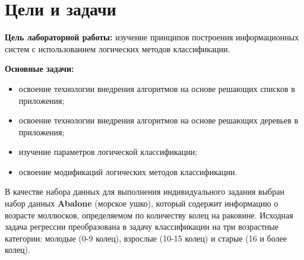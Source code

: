 \chapter*{Цели и задачи}
\label{ch:intro_lab4}

\textbf{Цель лабораторной работы:} изучение принципов построения информационных систем с использованием логических методов классификации.

\textbf{Основные задачи:}
\begin{itemize}
    \item освоение технологии внедрения алгоритмов на основе решающих списков в приложения;
    \item освоение технологии внедрения алгоритмов на основе решающих деревьев в приложения;
    \item изучение параметров логической классификации;
    \item освоение модификаций логических методов классификации.
\end{itemize}

В качестве набора данных для выполнения индивидуального задания выбран набор данных \textbf{Abalone} (морское ушко), который содержит информацию о возрасте моллюсков, определяемом по количеству колец на раковине. Исходная задача регрессии преобразована в задачу классификации на три возрастные категории: молодые (0-9 колец), взрослые (10-15 колец) и старые (16 и более колец).
\endinput

